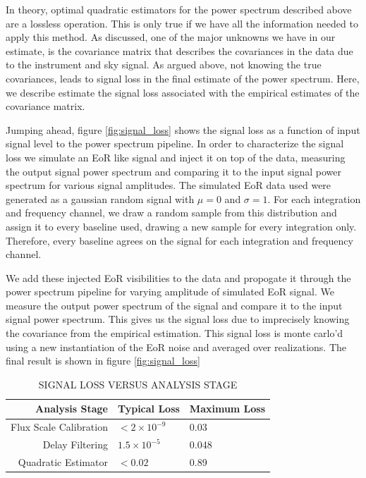 \documentclass[twocolumn,numberedappendix]{emulateapj} \shorttitle{PSA64}
\begin{document}
In theory, optimal quadratic estimators for the power spectrum described above are a
lossless operation. This is only true if we have all the information
needed to apply this method. As discussed, one of the major unknowns we have in our
estimate, is the covariance matrix that describes the covariances in the data
due to the instrument and sky signal. As argued above, not knowing the true
covariances, leads to signal loss in the final estimate of the power spectrum.
Here, we describe estimate the signal loss associated with the empirical
estimates of the covariance matrix.

Jumping ahead, figure \ref{fig:signal_loss} shows the signal loss as a function
of input signal level to the power spectrum pipeline. In order to characterize
the signal loss we simulate an EoR like signal and inject it on top of the data,
measuring the output signal power spectrum and comparing it to the input signal
power spectrum for various signal amplitudes. The simulated EoR data used were
generated as a gaussian random signal with $\mu=0$ and $\sigma=1$. For each
integration and frequency channel, we draw a random sample from this
distribution and assign it to every baseline used, drawing a new sample for
every integration only. Therefore, every baseline agrees on the signal for each
integration and frequency channel. 

We add these injected EoR visibilities to the data and propogate it through the
power spectrum pipeline for varying amplitude of simulated EoR signal. We
measure the output power spectrum of the signal and
compare it to the input signal power spectrum. This gives us the signal loss
due to imprecisely knowing the covariance from the empirical estimation. This
signal loss is monte carlo'd using a new instantiation of the EoR noise and
averaged over realizations. The final result is shown in figure
\ref{fig:signal_loss}

\begin{table}[htdp]
\caption{SIGNAL LOSS VERSUS ANALYSIS STAGE}
\begin{center}
\begin{tabular}{rll}
Analysis Stage & Typical Loss & Maximum Loss \\ \hline
Flux Scale Calibration &  $< 2 \times 10^{-9}$ & 0.03 \\
Delay Filtering & $1.5\times10^{-5}$ & 0.048 \\
Quadratic Estimator & $<0.02$ & 0.89 \\
\end{tabular}
\end{center}
\label{tbl:sigloss}
\end{table}%
\end{document}
